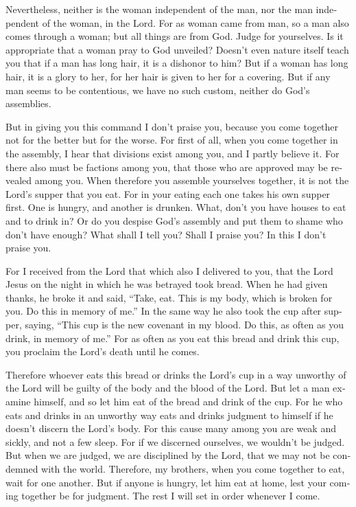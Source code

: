 \begin{paracol}{2}
\begin{otherlanguage}{english}
 Nevertheless, neither is the woman independent of the
man, nor the man independent of the woman, in the Lord. 
For as woman came from man, so a man also comes through a woman; but all
things are from God.  Judge for yourselves. Is it
appropriate that a woman pray to God unveiled?  Doesn't
even nature itself teach you that if a man has long hair, it is a
dishonor to him?  But if a woman has long hair, it is a
glory to her, for her hair is given to her for a covering.
 But if any man seems to be contentious, we have no such
custom, neither do God's assemblies.

 But in giving you this command I don't praise you,
because you come together not for the better but for the worse.
 For first of all, when you come together in the
assembly, I hear that divisions exist among you, and I partly believe
it.  For there also must be factions among you, that
those who are approved may be revealed among you.  When
therefore you assemble yourselves together, it is not the Lord's supper
that you eat.  For in your eating each one takes his own
supper first. One is hungry, and another is drunken. 
What, don't you have houses to eat and to drink in? Or do you despise
God's assembly and put them to shame who don't have enough? What shall I
tell you? Shall I praise you? In this I don't praise you.

 For I received from the Lord that which also I delivered
to you, that the Lord Jesus on the night in which he was betrayed took
bread.  When he had given thanks, he broke it and said,
``Take, eat. This is my body, which is broken for you. Do this in memory
of me.''  In the same way he also took the cup after
supper, saying, ``This cup is the new covenant in my blood. Do this, as
often as you drink, in memory of me.''  For as often as
you eat this bread and drink this cup, you proclaim the Lord's death
until he comes.

 Therefore whoever eats this bread or drinks the Lord's
cup in a way unworthy of the Lord will be guilty of the body and the
blood of the Lord.  But let a man examine himself, and so
let him eat of the bread and drink of the cup.  For he
who eats and drinks in an unworthy way eats and drinks judgment to
himself if he doesn't discern the Lord's body.  For this
cause many among you are weak and sickly, and not a few sleep.
 For if we discerned ourselves, we wouldn't be judged.
 But when we are judged, we are disciplined by the Lord,
that we may not be condemned with the world.  Therefore,
my brothers, when you come together to eat, wait for one another.
 But if anyone is hungry, let him eat at home, lest your
coming together be for judgment. The rest I will set in order whenever I
come.


\end{otherlanguage}
\end{paracol}
